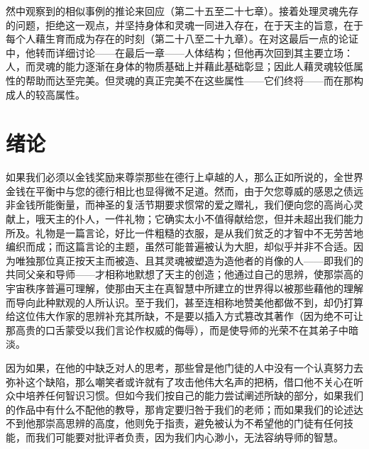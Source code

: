 然中观察到的相似事例的推论来回应（第二十五至二十七章）。接着处理灵魂先存的问题，拒绝这一观点，并坚持身体和灵魂一同进入存在，在于天主的旨意，在于每个人藉生育而成为存在的时刻（第二十八至二十九章）。在对这最后一点的论证中，他转而详细讨论——在最后一章——人体结构；但他再次回到其主要立场：人，而灵魂的能力逐渐在身体的物质基础上并藉此基础彰显；因此人藉灵魂较低属性的帮助而达至完美。但灵魂的真正完美不在这些属性——它们终将——而在那构成人的较高属性。\par


\section{绪论}

\par

如果我们必须以金钱奖励来尊崇那些在德行上卓越的人，那么正如所说的，全世界金钱在平衡中与您的德行相比也显得微不足道。然而，由于欠您尊威的感恩之债远非金钱所能衡量，而神圣的复活节期要求惯常的爱之赠礼，我们便向您的高尚心灵献上，哦天主的仆人，一件礼物；它确实太小不值得献给您，但并未超出我们能力所及。礼物是一篇言论，好比一件粗糙的衣服，是从我们贫乏的才智中不无劳苦地编织而成；而这篇言论的主题，虽然可能普遍被认为大胆，却似乎并非不合适。因为唯独那位真正按天主而被造、且其灵魂被塑造为造他者的肖像的人——即我们的共同父亲和导师——才相称地默想了天主的创造；他通过自己的思辨，使那崇高的宇宙秩序普遍可理解，使那由天主在真智慧中所建立的世界得以被那些藉他的理解而导向此种默观的人所认识。至于我们，甚至连相称地赞美他都做不到，却仍打算给这位伟大作家的思辨补充其所缺，不是要以插入方式篡改其著作（因为绝不可让那高贵的口舌蒙受以我们言论作权威的侮辱），而是使导师的光荣不在其弟子中暗淡。\par

因为如果，在他的中缺乏对人的思考，那些曾是他门徒的人中没有一个认真努力去弥补这个缺陷，那么嘲笑者或许就有了攻击他伟大名声的把柄，借口他不关心在听众中培养任何智识习惯。但如今我们按自己的能力尝试阐述所缺的部分，如果我们的作品中有什么不配他的教导，那肯定要归咎于我们的老师；而如果我们的论述达不到他那崇高思辨的高度，他则免于指责，避免被认为不希望他的门徒有任何技能，而我们可能要对批评者负责，因为我们内心渺小，无法容纳导师的智慧。\par

